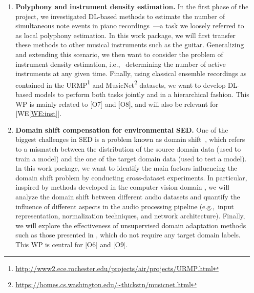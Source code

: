\documentclass[11pt,a4paper]{article}
\newcommand{\iec}{i.e.,\ }
\newcommand{\egc}{e.g.,\ }
\theoremstyle{plain} \newtheorem{define}{Definition}[section]
\begin{document}
{\begin{enumerate}[itemindent=0.5cm]
\item  \label{WI:poly}
\textbf{Polyphony and instrument density estimation.} 
%
In the first phase of the project, we investigated DL-based methods to estimate the number of simultaneous note events in piano recordings~\cite{TaenzerMA21_LocalPolyphonyEstimation_Electronics}---a task we loosely referred to as local polyphony estimation. In this work package, we will first transfer these methods to other musical instruments such as the guitar.
Generalizing and extending this scenario, we then want to consider the problem of instrument density estimation, \iec
determining the number of active instruments at any given time.
%
Finally, using classical ensemble recordings as contained in the URMP\footnote{\url{http://www2.ece.rochester.edu/projects/air/projects/URMP.html}} and MusicNet\footnote{\url{https://homes.cs.washington.edu/~thickstn/musicnet.html}} datasets, we want to develop DL-based models to perform both tasks jointly and in a hierarchical fashion. 
%
%
This WP is mainly related to [O7] and [O8], and will also be relevant for [WE\ref{WE:inst}].

\item  \label{WI:shift}
\textbf{Domain shift compensation for environmental SED.} 
%
One of the biggest challenges in SED is a problem known as domain shift~\cite{Stacke:2020:DomainShift:JBHI}, which refers to a mismatch between the distribution of the source domain data (used to train a model) and the one of the target domain data (used to test a model). In this work package, we want to 
identify the main factors influencing the domain shift problem by conducting cross-dataset experiments.
%
In particular, inspired by methods developed in the computer vision domain \cite{Kouw:2021:DomainAdaptation:TPAMI,Wang:2018:DomainAdaptation:NC}, we will analyze the domain shift between different audio datasets and quantify the influence of different aspects in the audio processing pipeline (\egc input representation, normalization techniques, and network architecture).
%
Finally, we will explore the effectiveness of unsupervised domain adaptation methods such as those presented in \cite{Elsahar:2019:DomainShift:EMNLP,GharibDCSV18_DomainAdaptation_CoRR}, which do not require any target domain labels.
%
This WP is central for [O6] and [O9].


\end{enumerate}}
\end{document}
